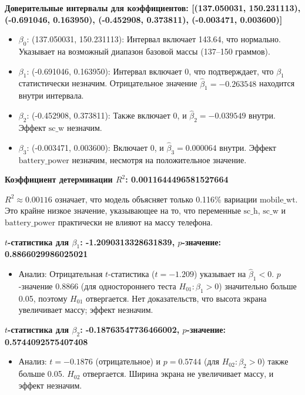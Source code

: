 \documentclass[14pt]{extreport}
\begin{document}
\textbf{Доверительные интервалы для коэффициентов: [(137.050031, 150.231113), (-0.691046, 0.163950), (-0.452908, 0.373811), (-0.003471, 0.003600)]}

\begin{itemize}
    \item \(\beta_0\): (137.050031, 150.231113): Интервал включает 143.64, что нормально. Указывает на возможный диапазон базовой массы (137--150 граммов).
    \item \(\beta_1\): (-0.691046, 0.163950): Интервал включает 0, что подтверждает, что \(\beta_1\) статистически незначим. Отрицательное значение \(\hat{\beta}_1 = -0.263548\) находится внутри интервала.
    \item \(\beta_2\): (-0.452908, 0.373811): Также включает 0, и \(\hat{\beta}_2 = -0.039549\) внутри. Эффект \(\text{sc\_w}\) незначим.
    \item \(\beta_3\): (-0.003471, 0.003600): Включает 0, и \(\hat{\beta}_3 = 0.000064\) внутри. Эффект \(\text{battery\_power}\) незначим, несмотря на положительное значение.
\end{itemize}

\textbf{Коэффициент детерминации \(R^2\): 0.0011644496581527664}

\(R^2 \approx 0.00116\) означает, что модель объясняет только 0.116\% вариации \(\text{mobile\_wt}\). Это крайне низкое значение, указывающее на то, что переменные \(\text{sc\_h}\), \(\text{sc\_w}\) и \(\text{battery\_power}\) практически не влияют на массу телефона. 

\textbf{\(t\)-статистика для \(\beta_1\): -1.2090313328631839, \(p\)-значение: 0.8866029986025021}

\begin{itemize}
    \item Анализ: Отрицательная \(t\)-статистика (\(t = -1.209\)) указывает на \(\hat{\beta}_1 < 0\). \(p\)-значение 0.8866 (для одностороннего теста \(H_{01}: \beta_1 > 0\)) значительно больше 0.05, поэтому \(H_{01}\) отвергается. Нет доказательств, что высота экрана увеличивает массу; эффект незначим.
\end{itemize}

\textbf{\(t\)-статистика для \(\beta_2\): -0.18763547736466002, \(p\)-значение: 0.5744092575407408}

\begin{itemize}
    \item Анализ: \(t = -0.1876\) (отрицательное) и \(p = 0.5744\) (для \(H_{02}: \beta_2 > 0\)) также больше 0.05. \(H_{02}\) отвергается. Ширина экрана не увеличивает массу, и эффект незначим.
\end{itemize}
\end{document}
